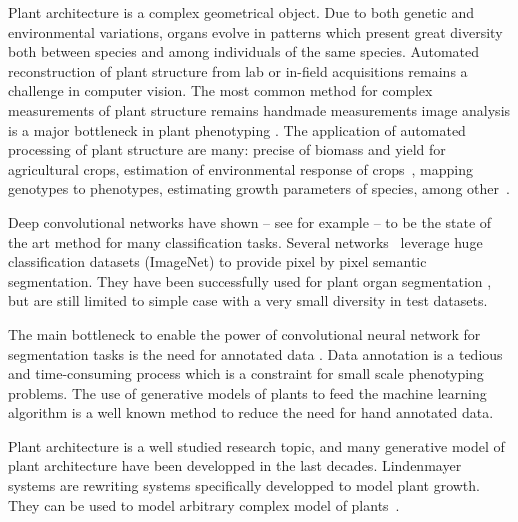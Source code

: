 Plant architecture is a complex geometrical object. Due to both genetic and
environmental variations, organs evolve in patterns which present great diversity
both between species and among individuals of the same species. Automated
reconstruction of plant structure from lab or in-field acquisitions remains a challenge in computer
vision. The most common method for complex measurements of plant structure
remains handmade measurements image analysis is a major bottleneck in plant phenotyping
\cite{minervini2015image}. The application of automated processing of plant structure are many: precise
 of biomass and yield for agricultural crops, estimation of environmental response
of crops~\cite{peirone2018assessing, srivastava2017drought},  mapping genotypes to
phenotypes, estimating growth parameters of species, among other~\cite{denis1998symmetry}.

Deep convolutional networks have shown -- see for example \cite{krizhevsky2012imagenet} --
to be the state of the art method for many classification tasks. Several
networks~\cite{ronneberger2015u, long2015fully} leverage huge classification datasets (ImageNet) to provide pixel by
pixel semantic segmentation. They have been successfully used for plant organ
segmentation \cite{shi2019plant}, but are still limited to simple case with a very
small diversity in test datasets.

The main bottleneck to enable the power of convolutional neural network for segmentation
tasks is the need for annotated data .
Data annotation is a tedious and time-consuming process
which is a constraint for small scale phenotyping problems. The use of generative
models of plants to feed the machine learning algorithm is a well known method to
reduce the need for hand annotated data.

Plant architecture is a well studied research topic, and many generative model
of plant architecture have been developped in the last decades. Lindenmayer
systems are rewriting systems specifically developped to model plant growth.
They can be used to model arbitrary complex model of plants~\cite{boudon_l-py:_2012}.

